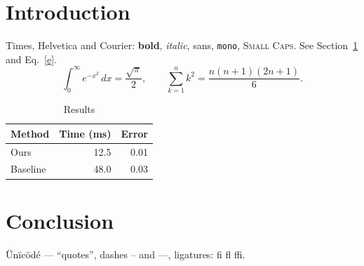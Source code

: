\documentclass{article}
\begin{document}
\begin{abstract}
We measure the effect of $\alpha$ on the rate $r(t)=r_0e^{-\lambda t}$ and report results in Table~\ref{t}.
\end{abstract}
\section{Introduction}\label{s}
Times, Helvetica and Courier: \textbf{bold}, \textit{italic}, \textsf{sans}, \texttt{mono}, \textsc{Small Caps}. See Section~\ref{s} and Eq.~\eqref{e}.
\begin{equation}\label{e}
\int_0^\infty e^{-x^2}\,dx=\frac{\sqrt\pi}{2},\qquad \sum_{k=1}^{n}k^2=\frac{n(n+1)(2n+1)}{6}.
\end{equation}
\begin{table}[t]\centering\caption{Results}\label{t}
\begin{tabular}{lrr}\hline Method & Time (ms) & Error\\\hline Ours & 12.5 & 0.01\\ Baseline & 48.0 & 0.03\\\hline\end{tabular}
\end{table}
\section{Conclusion}
Ünïcödé — “quotes”, dashes -- and ---, ligatures: fi fl ffi.
\end{document}
